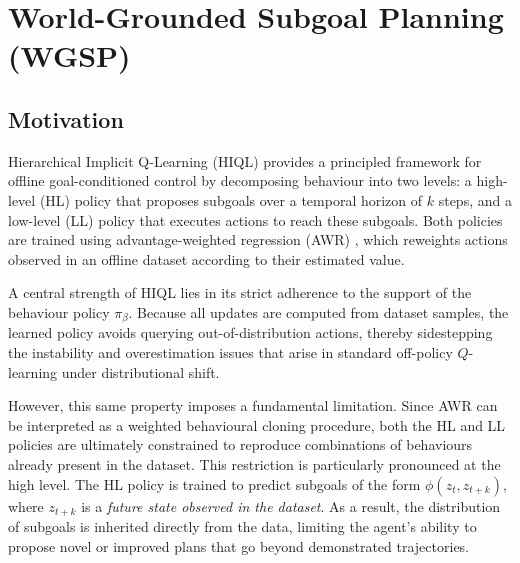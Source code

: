 
\chapter{World-Grounded Subgoal Planning (WGSP)}
\label{ch:wgsp}

\section{Motivation}
\label{sec:wgsp:motivation}

Hierarchical Implicit Q-Learning (HIQL) \cite{park2024hiqlofflinegoalconditionedrl}
provides a principled framework for offline goal-conditioned control by
decomposing behaviour into two levels: a high-level (HL) policy that proposes
subgoals over a temporal horizon of $k$ steps, and a low-level (LL) policy that
executes actions to reach these subgoals. Both policies are trained using
advantage-weighted regression (AWR) \citep{awr,iql}, which reweights actions observed in an offline dataset according to their estimated value.

A central strength of HIQL lies in its strict adherence to the support of the behaviour policy $\pi_\beta$. Because all updates are computed from dataset samples, the learned policy avoids querying out-of-distribution actions, thereby sidestepping the instability and overestimation issues that arise in standard off-policy $Q$-learning under distributional shift.

However, this same property imposes a fundamental limitation. Since AWR can be interpreted as a weighted behavioural cloning procedure, both the HL and LL policies are ultimately constrained to reproduce combinations of behaviours already present in the dataset. This restriction is particularly pronounced at the high level. The HL policy is trained to predict subgoals of the form $\phi(z_t, z_{t+k})$, where $z_{t+k}$ is a \emph{future state observed in the dataset}. As a result, the distribution of subgoals is inherited directly from the data, limiting the agent's ability to propose novel or improved plans that go beyond demonstrated trajectories.


